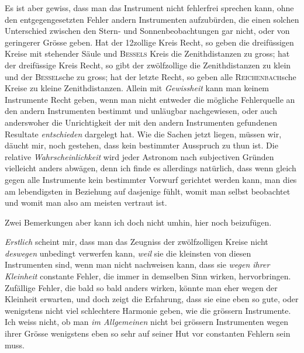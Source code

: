 \par\indent Es ist aber gewiss, dass man das Instrument nicht fehlerfrei sprechen kann, ohne den entgegengesetzten Fehler andern Instrumenten aufzubürden, die einen solchen Unterschied zwischen den Stern- und Sonnenbeobachtungen gar nicht, oder von geringerer Grösse geben. Hat der 12zollige Kreis Recht, so geben die dreifüssigen Kreise mit stehender Säule und \textsc{Bessels} Kreis die Zenithdistanzen zu gross; hat der dreifüssige Kreis Recht, so gibt der zwölfzollige die Zenithdistanzen zu klein und der \textsc{Bessel}sche zu gross; hat der letzte Recht, so geben alle \textsc{Reichenbach}sche Kreise zu kleine Zenithdistanzen. Allein mit \emph{Gewissheit} kann man keinem Instrumente Recht geben, wenn man nicht entweder die mögliche Fehlerquelle an den andern Instrumenten bestimmt und unläugbar nachgewiesen, oder auch anderswoher die Unrichtigkeit der mit den andern Instrumenten gefundenen Resultate \emph{entschieden} dargelegt hat. Wie die Sachen jetzt liegen, müssen wir, däucht mir, noch gestehen, dass kein bestimmter Ausspruch zu thun ist. Die relative \emph{Wahrscheinlichkeit} wird jeder Astronom nach subjectiven Gründen vielleicht anders abwägen, denn ich finde es allerdings natürlich, dass wenn gleich gegen alle Instrumente kein bestimmter Vorwurf gerichtet werden kann, man dies am lebendigsten in Beziehung auf dasjenige fühlt, womit man selbst beobachtet und womit man also am meisten vertraut ist.

\par\indent Zwei Bemerkungen aber kann ich doch nicht umhin, hier noch beizufügen.

\par\indent \emph{Erstlich} scheint mir, dass man das Zeugniss der zwölfzolligen Kreise nicht \emph{deswegen} unbedingt verwerfen kann, \emph{weil} sie die kleinsten von diesen Instrumenten sind, wenn man nicht nachweisen kann, dass sie \emph{wegen ihrer Kleinheit} constante Fehler, die immer in demselben Sinn wirken, hervorbringen. Zufällige Fehler, die bald so bald anders wirken, könnte man eher wegen der Kleinheit erwarten, und doch zeigt die Erfahrung, dass sie eine eben so gute, oder wenigstens nicht viel schlechtere Harmonie geben, wie die grössern Instrumente. Ich weiss nicht, ob man \emph{im Allgemeinen} nicht bei grössern Instrumenten wegen ihrer Grösse wenigstens eben so sehr auf seiner Hut vor constanten Fehlern sein muss.

